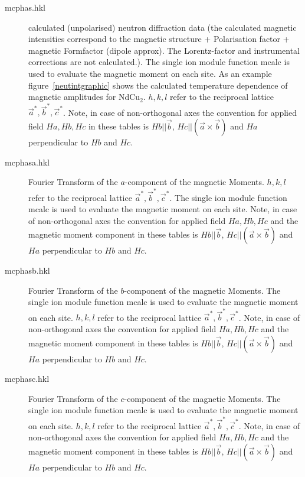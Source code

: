 \begin{description}
\item [\prg mcphas.hkl]    calculated (unpolarised) neutron diffraction data (the calculated magnetic intensities
    correspond to the magnetic structure + Polarisation factor + magnetic Formfactor (dipole approx). The
    Lorentz-factor  and  instrumental corrections are not calculated.). The single ion module function
    {\prg mcalc} is used to evaluate the magnetic moment on each site.
    As an example figure~\ref{neutintgraphic}
    shows the calculated temperature dependence of magnetic amplitudes for NdCu$_2$.
                           $h,k,l$ refer to the reciprocal lattice $\vec a^*,\vec b^*,\vec c^*$.
                            Note, in case of non-orthogonal axes the convention for applied field $Ha, Hb,Hc$ 
                             in these tables 
                            is $Hb||\vec b$, $Hc||(\vec a \times \vec b)$ and $Ha$ perpendicular to $Hb$ and $Hc$.
    
\item [\prg mcphasa.hkl]    Fourier Transform of the $a$-component of the magnetic Moments.
                           $h,k,l$ refer to the reciprocal lattice $\vec a^*,\vec b^*,\vec c^*$. The single ion module function
    {\prg mcalc} is used to evaluate the magnetic moment on each site.
                            Note, in case of non-orthogonal axes the convention for applied field $Ha, Hb,Hc$ and
                            the magnetic moment component in these tables 
                            is $Hb||\vec b$, $Hc||(\vec a \times \vec b)$ and $Ha$ perpendicular to $Hb$ and $Hc$.
\item [\prg mcphasb.hkl]    Fourier Transform of the $b$-component of the magnetic Moments. The single ion module function
    {\prg mcalc} is used to evaluate the magnetic moment on each site. 
                           $h,k,l$ refer to the reciprocal lattice $\vec a^*,\vec b^*,\vec c^*$.
                            Note, in case of non-orthogonal axes the convention for applied field $Ha, Hb,Hc$ and
                            the magnetic moment component in these tables 
                            is $Hb||\vec b$, $Hc||(\vec a \times \vec b)$ and $Ha$ perpendicular to $Hb$ and $Hc$.
\item [\prg mcphasc.hkl]    Fourier Transform of the $c$-component of the magnetic Moments. The single ion module function
    {\prg mcalc} is used to evaluate the magnetic moment on each site.
                           $h,k,l$ refer to the reciprocal lattice $\vec a^*,\vec b^*,\vec c^*$.
                            Note, in case of non-orthogonal axes the convention for applied field $Ha, Hb,Hc$ and
                            the magnetic moment component in these tables 
                            is $Hb||\vec b$, $Hc||(\vec a \times \vec b)$ and $Ha$ perpendicular to $Hb$ and $Hc$.
\end{description} 




